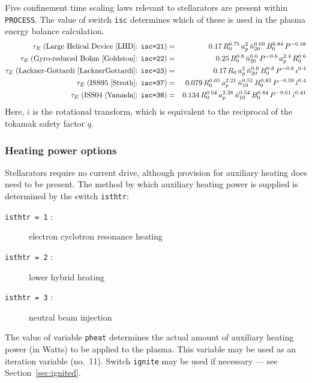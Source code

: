 \documentclass[11pt,a4paper]{report}
\newcommand{\process}{\mbox{\texttt{PROCESS}}}
\begin{document}
Five confinement time scaling laws relevant to stellarators are present
within \process. The value of switch \texttt{isc} determines which of these is
used in the plasma energy balance calculation.
\begin{eqnarray}
\tau_E\; (\mbox{Large Helical Device~\cite{LHD}: \texttt{isc=21}})
& = & 0.17 \, R_0^{0.75} \, a_p^2 \, \bar{n}_{20}^{0.69} \, B_0^{0.84} \, P^{-0.58} \\
\tau_E\; (\mbox{Gyro-reduced Bohm~\cite{Goldston}: \texttt{isc=22}})
 & = & 0.25 \, B_0^{0.8} \, \bar{n}_{20}^{0.6} \, P^{-0.6} \, a_p^{2.4} \, R_0^{0.6} \\
\tau_E\; (\mbox{Lackner-Gottardi~\cite{LacknerGottardi}: \texttt{isc=23}})
& = & 0.17 \, R_0 \, a_p^2 \, \bar{n}_{20}^{0.6} \, B_0^{0.8} \, P^{-0.6} \, \iota^{0.4} \\
\tau_E\; (\mbox{ISS95~\cite{Stroth}: \texttt{isc=37}})
& = & 0.079 \, R_0^{0.65} \, a_p^{2.21} \, \bar{n}_{19}^{0.51} \, B_0^{0.83}
\, P^{-0.59} \, \bar{\iota}^{0.4} \\
\tau_E\; (\mbox{ISS04~\cite{Yamada}: \texttt{isc=38}})
& = & 0.134 \, R_0^{0.64} \, a_p^{2.28} \, \bar{n}_{19}^{0.54} \, B_0^{0.84}
\, P^{-0.61} \, \bar{\iota}^{0.41}
\end{eqnarray}
Here, $\bar{\iota}$ is the rotational transform, which is equivalent to the reciprocal
of the tokamak safety factor $q$.

\subsubsection{Heating power options}

Stellarators require no current drive, although provision for auxiliary
heating does need to be present. The method by which auxiliary heating power
is supplied is determined by the switch \texttt{isthtr}:
\begin{description}
\item [\texttt{isthtr = 1} :] electron cyclotron resonance heating
\item [\texttt{isthtr = 2} :] lower hybrid heating
\item [\texttt{isthtr = 3} :] neutral beam injection
\end{description}
The value of variable \texttt{pheat} determines the actual amount of auxiliary
heating power (in Watts) to be applied to the plasma. This variable may be
used as an iteration variable (no.\ 11). Switch \texttt{ignite} may be used if
necessary --- see Section~\ref{sec:ignited}.
\end{document}
